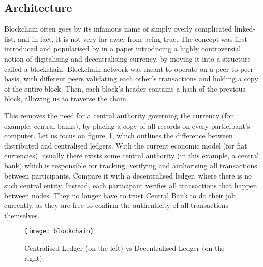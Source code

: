\subsection{Architecture}
Blockchain often goes by its infamous name of simply overly complicated linked-list, and in fact, it is not very far away from being true. The concept was first introduced and popularised by \citet{nakamoto2008peer} in a paper introducing a highly controversial notion of digitalising and decentralising currency, by moving it into a structure called a blockchain. Blockchain network was meant to operate on a peer-to-peer basis, with different peers validating each other's transactions and holding a copy of the entire block. Then, each block's header contains a hash of the previous block, allowing us to traverse the chain.

This removes the need for a central authority governing the currency (for example, central banks), by placing a copy of all records on every participant's computer. Let us focus on figure~\ref{fig:blockchain}, which outlines the difference between distributed and centralised ledgers. With the current economic model (for fiat currencies), usually there exists some central authority (in this example, a central bank) which is responsible for tracking, verifying and authorising all transactions between participants. Compare it with a decentralised ledger, where there is no such central entity. Instead, each participant verifies all transactions that happen between nodes. They no longer have to trust Central Bank to do their job currently, as they are free to confirm the authenticity of all transactions themselves.

\begin{figure}[ht]
    \centering
    \texttt{[image: blockchain]}
    \caption{Centralised Ledger (on the left) vs Decentralised Ledger (on the right).}
    \label{fig:blockchain}
\end{figure}

